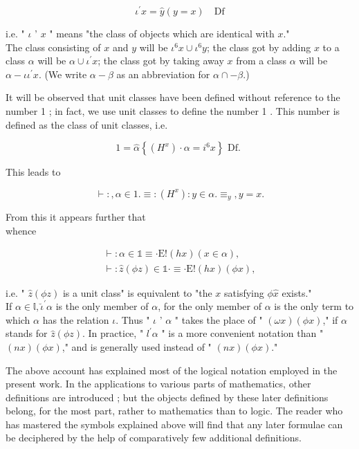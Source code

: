 \documentclass[10pt]{article}
\begin{document}
$$
\iota^{\prime} x=\hat{y}(y=x) \quad \mathrm{Df}
$$

i.e. " $\iota$ ' $x$ " means "the class of objects which are identical with $x$."\\
The class consisting of $x$ and $y$ will be $\iota^{6} x \cup \iota^{6} y$; the class got by adding $x$ to a class $\alpha$ will be $\alpha \cup \iota^{\prime} x$; the class got by taking away $x$ from a class $\alpha$ will be $\alpha-\iota \iota^{\prime} x$. (We write $\alpha-\beta$ as an abbreviation for $\alpha \cap-\beta$.)

It will be observed that unit classes have been defined without reference to the number 1 ; in fact, we use unit classes to define the number 1 . This number is defined as the class of unit classes, i.e.

$$
1=\hat{\alpha}\left\{\left(H^{x}\right) \cdot \alpha=i^{6} x\right\} \text { Df. }
$$

This leads to

$$
\vdash:, \alpha \in 1 . \equiv:\left(H^{x}\right): y \in \alpha . \equiv_{y}, y=x .
$$

From this it appears further that\\
whence

$$
\begin{gathered}
\vdash: \alpha \in \mathbb{1} \equiv \cdot \mathrm{E}!(h x)(x \in \alpha), \\
\vdash: \hat{z}(\phi z) \in \mathbb{1} \cdot \equiv \cdot \mathrm{E}!(h x)(\phi x),
\end{gathered}
$$

i.e. " $\hat{z}(\phi z)$ is a unit class" is equivalent to "the $x$ satisfying $\phi \hat{x}$ exists."\\
If $\alpha \in \mathbb{l}, \breve{\iota}^{\prime} \alpha$ is the only member of $\alpha$, for the only member of $\alpha$ is the only term to which $\alpha$ has the relation $\iota$. Thus " $\iota$ ' $\alpha$ " takes the place of " $(\omega x)(\phi x)$," if $\alpha$ stands for $\hat{z}(\phi z)$. In practice, " $l^{\prime} \alpha$ " is a more convenient notation than " $(n x)(\phi x)$," and is generally used instead of " $(n x)(\phi x)$."

The above account has explained most of the logical notation employed in the present work. In the applications to various parts of mathematics, other definitions are introduced ; but the objects defined by these later definitions belong, for the most part, rather to mathematics than to logic. The reader who has mastered the symbols explained above will find that any later formulae can be deciphered by the help of comparatively few additional definitions.
\end{document}
